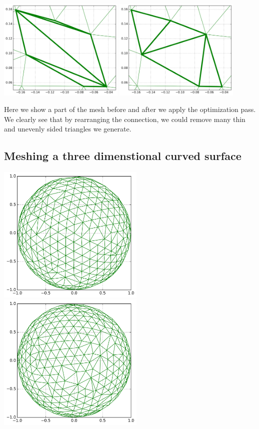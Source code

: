 \documentclass[10pt,fleqn]{article}
\begin{document}
\begin{center}
  \includegraphics[width=6cm]{../MeshGen/img/mesh2d_circ_noopt.png}
  \includegraphics[width=6cm]{../MeshGen/img/mesh2d_circ_opt.png}\\
\end{center}

Here we show a part of the mesh before and after we apply the optimization pass.
We clearly see that by rearranging the connection, we could remove many thin
and unevenly sided triangles we generate.

\subsection{Meshing a three dimenstional curved surface}

\begin{center}
  \includegraphics[width=7cm]{../MeshGen/img/mesh2d_sphere_front.png}
  \includegraphics[width=7cm]{../MeshGen/img/mesh2d_sphere_back.png}
\end{center}
\end{document}
